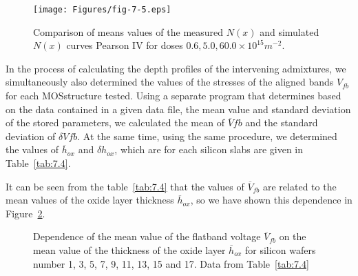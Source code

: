 \begin{figure}[h!]\centering
  \begin{minipage}[c]{\myfiguresize}
    \begin{center}
      \texttt{[image: Figures/fig-7-5.eps]}
    \end{center}
    \caption[Comparison of the mean values of the measured curves
      $N(x)$ and simulated using the Pearson IV method]{Comparison of
      means values of the measured $N(x)$ and simulated $N(x)$ curves
      Pearson IV for doses $0.6, 5.0, 60.0 \times 10^{15}
      m^{-2}$.}\label{fig:7.5}
  \end{minipage}
\end{figure}

In the process of calculating the depth profiles of the intervening
admixtures, we simultaneously also determined the values of the
stresses of the aligned bands $V_{fb}$ for each MOS\@ structure
tested. Using a separate program that determines based on the data
contained in a given data file, the mean value and standard deviation
of the stored parameters, we calculated the mean of $\overline V{fb}$
and the standard deviation of $\delta V{fb}$. At the same time, using
the same procedure, we determined the values of $\overline h_{ox}$ and
$\delta h_{ox}$, which are for each silicon slabs are given in
Table~\ref{tab:7.4}.

It can be seen from the table~\ref{tab:7.4} that the values of
$\overline V_{fb}$ are related to the mean values of the oxide layer
thickness $\overline h_{ox}$, so we have shown this dependence in
Figure~\ref{fig:7.6}.

\newpage
\begin{figure}[h!]
  \begin{minipage}[c]{\myfiguresize}
    \begin{center}
      
    \end{center}
    \caption[Dependence of the mean value of $\overline V_{fb}$ on the
      mean value of the oxide layer thickness $\overline
      h_{ox}$]{Dependence of the mean value of the flatband voltage
      $\overline V_{fb}$ on the mean value of the thickness of the
      oxide layer $\overline h_{ox}$ for silicon wafers number 1, 3,
      5, 7, 9, 11, 13, 15 and 17. Data from
      Table~\ref{tab:7.4}}\label{fig:7.6}
  \end{minipage}
\end{figure}

